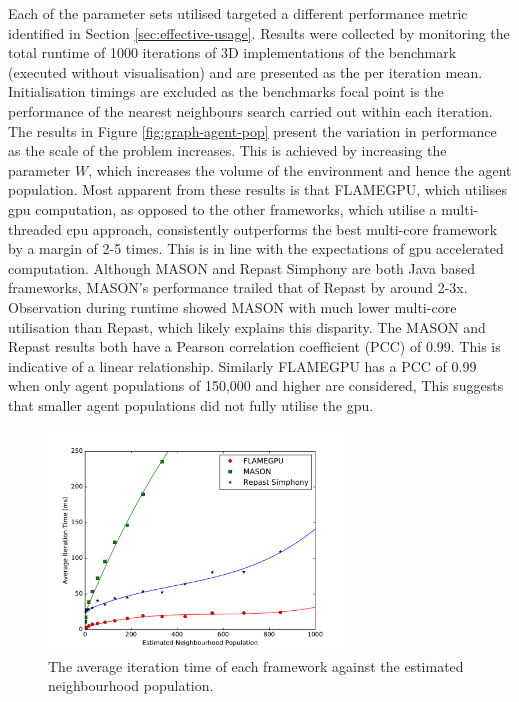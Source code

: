   Each of the parameter sets utilised targeted a different performance metric identified in Section \ref{sec:effective-usage}. Results were collected by monitoring the total runtime of 1000 iterations of 3D implementations of the benchmark (executed without visualisation) and are presented as the per iteration mean. Initialisation timings are excluded as the benchmarks focal point is the performance of the nearest neighbours search carried out within each iteration.
  The results in Figure \ref{fig:graph-agent-pop} present the variation in performance as the scale of the problem increases. This is achieved by increasing the parameter $W$, which increases the volume of the environment and hence the agent population. Most apparent from these results is that FLAMEGPU, which utilises \gls{gpu} computation, as opposed to the other frameworks, which utilise a multi-threaded \gls{cpu} approach, consistently outperforms the best multi-core framework by a margin of 2-5 times. This is in line with the expectations of \gls{gpu} accelerated computation\cite{LK*10}. Although MASON and Repast Simphony are both Java based frameworks, MASON's performance trailed that of Repast by around 2-3x. Observation during runtime showed MASON with much lower multi-core utilisation than Repast, which likely explains this disparity. 
  The MASON and Repast results both have a Pearson correlation coefficient (PCC) \cite{PCC} of 0.99. This is indicative of a linear relationship. Similarly FLAMEGPU has a PCC of 0.99 when only agent populations of 150,000 and higher are considered, This suggests that smaller agent populations did not fully utilise the \gls{gpu}.
  \begin{figure}[tb]
\begin{center}
    \includegraphics[width=0.7\textwidth]{../resources/neighbourscale_graph/graph.pdf}
    \caption{\label{fig:graph-neighbourhood-pop}The average iteration time of each framework against the estimated neighbourhood population.}
\end{center}
\vspace{-1cm}
\end{figure}
  
